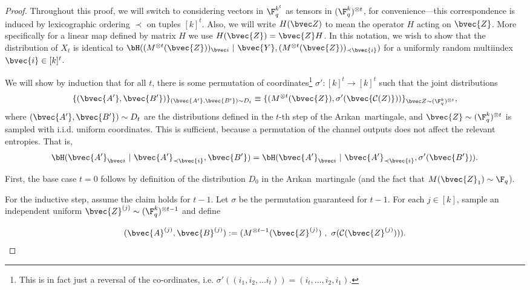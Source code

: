 \documentclass[11pt]{article}
\newcommand{\Arikan}{Ar\i kan}
\begin{document}
\begin{proof}
		Throughout this proof, we will switch to
	considering vectors in $\F_q^{k^t}$ as tensors in
	$(\F_q^k)^{\otimes t}$, for convenience---this correspondence is induced by lexicographic ordering $\prec$ on tuples $[k]^t$.
	Also, we will write $H(\bvec Z)$ to mean
	the operator $H$ acting on $\bvec{Z}$. More specifically for a linear map defined by matrix $H$ we use $H(\bvec{Z})=\bvec{Z}H$.
	In this notation, we wish to show that the distribution of $X_t$ is identical to $\bH((M^{\otimes t}(\bvec{Z}))_{\bvec i} ~|~ \bvec{Y}, (M^{\otimes t}(\bvec{Z}))_{\prec \bvec{i}})$
	for a uniformly random multiindex $\bvec{i} \in [k]^t$.
	
	We will show by induction that for all $t$, there is some permutation
	of coordinates\footnote{This is in fact just a reversal of the co-ordinates, i.e. $\sigma'((i_1, i_2,
		\dots i_t)) = (i_t, \dots, i_2, i_1)$.} 
	$\sigma': [k]^t \to [k]^t$
	such that the joint distributions
	\begin{equation}
	\label{eq:arikan-is-polar}
	    \{(\bvec{A'}, \bvec{B'})\}_{(\bvec{A'}, \bvec{B'}) \sim D_t}
	\equiv
	\{(M^{\otimes t}(\bvec{Z}), \sigma'(\bvec{\mathcal{C}(Z)}))\}_{\bvec Z \sim (\F_q^k)^{\otimes t}},
	\end{equation}
	where $(\bvec{A'}, \bvec{B'}) \sim D_t$ are the distributions defined in the $t$-th step of the \Arikan~martingale, and
	$\bvec{Z} \sim (\F_q^k)^{\otimes t}$ is sampled with i.i.d. uniform coordinates.
	This is sufficient, because a permutation of the channel outputs does not affect the relevant entropies. That is,
	$$
	\bH(\bvec{A'}_{\bvec i} ~|~ 
	\bvec{A'}_{\prec\bvec{i}}, \bvec{B'})
	=
	\bH(\bvec{A'}_{\bvec i} ~|~ 
	\bvec{A'}_{\prec\bvec{i}}, \sigma'(\bvec{B'})).
	$$
	
	First, the base case $t=0$ follows by definition of the distribution $D_0$ in the \Arikan~martingale (and the fact that $M(\bvec{Z}_1)\sim\F_q$).
	
	For the inductive step, assume the claim holds for $t-1$.
	Let $\sigma$ be the permutation guaranteed for $t-1$.
	For each $j \in [k]$, sample an independent uniform
	$\bvec{Z}^{(j)} \sim (\F_q^k)^{\otimes t-1}$
	and define
	
	\begin{equation}
		\label{eqn:def-sampling}
		(\bvec{A}^{(j)}, \bvec{B}^{(j)})
		:=
		(  M^{\otimes t-1}(\bvec{Z}^{(j)}) ~,~ \sigma(\mathcal{C}(\bvec{Z}^{(j)}))).
	\end{equation}
	

\end{proof}
\end{document}
